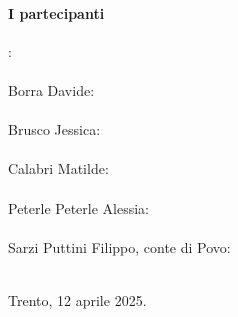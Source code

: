 \documentclass{article}
\begin{document}
\paragraph{I partecipanti}:
\\
\bigskip
\\
Borra Davide: \hrulefill
\\
\bigskip
\\
Brusco Jessica: \hrulefill
\\
\bigskip
\\
Calabri Matilde: \hrulefill
\\
\bigskip
\\
Peterle Peterle Alessia: \hrulefill
\\
\bigskip
\\
Sarzi Puttini Filippo, conte di Povo: \hrulefill
\\
\bigskip
\\
\begin{flushright}
    Trento, 12 aprile 2025.
\end{flushright}
\end{document}

